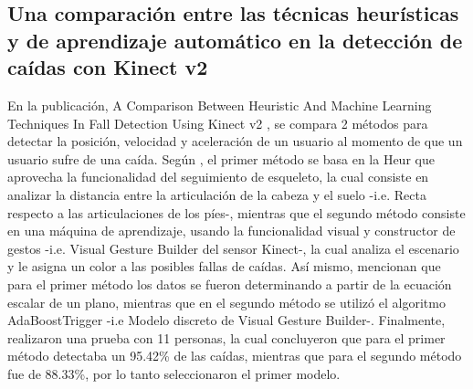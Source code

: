 \subsection{Una comparaci\'on entre las t\'ecnicas heur\'isticas y de aprendizaje autom\'atico en la detecci\'on de ca\'idas con Kinect v2} \label{tr:7}
En la publicaci\'on, A Comparison Between Heuristic And Machine Learning Techniques In Fall Detection Using Kinect v2 \cite{amini2016comparison}, se compara 2 m\'etodos para detectar la posici\'on, velocidad y aceleraci\'on de un usuario al momento de que un usuario sufre de una ca\'ida.
\medbreak 
Seg\'un , el primer m\'etodo se basa en la \gls{Heur} que aprovecha la funcionalidad del seguimiento de esqueleto, la cual consiste en analizar la distancia entre la articulaci\'on de la cabeza y el suelo -i.e. Recta respecto a las articulaciones de los p\'ies-, mientras que el segundo m\'etodo consiste en una m\'aquina de aprendizaje, usando la funcionalidad visual y constructor de gestos -i.e. Visual Gesture Builder del sensor Kinect-, la cual analiza el escenario y le asigna un color a las posibles fallas de ca\'idas.
\medbreak 
As\'i mismo,  mencionan que para el primer m\'etodo los datos se fueron determinando a partir de la ecuaci\'on escalar de un plano, mientras que en el segundo m\'etodo se utiliz\'o el algoritmo AdaBoostTrigger -i.e Modelo discreto de Visual Gesture Builder-.
\medbreak 
Finalmente,  realizaron una prueba con 11 personas, la cual concluyeron que para el primer m\'etodo detectaba un 95.42\% de las ca\'idas, mientras que para el segundo m\'etodo fue de 88.33\%, por lo tanto seleccionaron el primer modelo.

